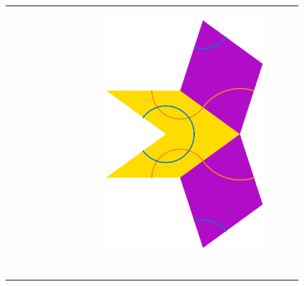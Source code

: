 \documentclass[]{article}
\begin{document}
\begin{figure}[H]
\begin{tabular}{cc}
\begin{subfigure}[b]{0.4\textwidth}
	        \end{subfigure}   &
            \begin{subfigure}[b]{0.4\textwidth}
             \centering
             \includegraphics[scale=0.4]{SkinnyInflation1}
             \end{subfigure}   \\
	       	 \begin{subfigure}[b]{0.4\textwidth}
             \centering

\end{subfigure}
\end{tabular}
\end{figure}
\end{document}
